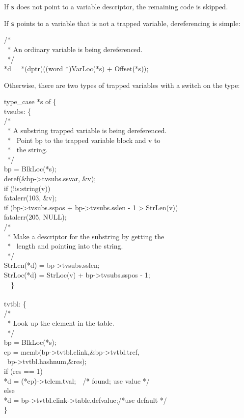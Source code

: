 \noindent
If \texttt{s} does not point to a variable descriptor, the remaining code is skipped.

If \texttt{s} points to a variable that is not a trapped variable,
dereferencing is simple:

\begin{iconcode}
\>\>\>/*\\
\>\>\>\ * An ordinary variable is being dereferenced.\\
\>\>\>\ */\\
\>\>\>*d = *(dptr)((word *)VarLoc(*s) + Offset(*s));
\end{iconcode}

Otherwise, there are two types of trapped variables with a switch on the type:

\begin{iconcode}
\>type\_case *s of \{\\
\>\>tvsubs: \{\\
\>\>\>/*\\
\>\>\>\ * A substring trapped variable is being dereferenced.\\
\>\>\>\ * \ Point bp to the trapped variable block and v to\\
\>\>\>\ * \ the string.\\
\>\>\>\ */\\
\>\>\>bp = BlkLoc(*s);\\
\>\>\>deref(\&bp->tvsubs.ssvar, \&v);\\
\>\>\>if (!is:string(v))\\
\>\>\>\>fatalerr(103, \&v);\\
\>\>\>if (bp->tvsubs.sspos + bp->tvsubs.sslen - 1 > StrLen(v))\\
\>\>\>\>fatalerr(205, NULL);\\
\>\>\>/*\\
\>\>\>\ * Make a descriptor for the substring by getting the\\
\>\>\>\ * \ length and pointing into the string.\\
\>\>\>\ */\\
\>\>\>StrLen(*d) = bp->tvsubs.sslen;\\
\>\>\>StrLoc(*d) = StrLoc(v) + bp->tvsubs.sspos - 1;\\
\>\>\ \ \}\\
\\
\>\>tvtbl: \{\\
\>\>\>/*\\
\>\>\>\ * Look up the element in the table.\\
\>\>\>\ */\\
\>\>\>bp = BlkLoc(*s);\\
\>\>\>ep = memb(bp->tvtbl.clink,\&bp->tvtbl.tref,\\
\>\>\>\>\>\>\ bp->tvtbl.hashnum,\&res);\\
\>\>\>if (res == 1)\\
\>\>\>\>*d = (*ep)->telem.tval;\ \ /* found; use value */\\
\>\>\>else\\
\>\>\>\>*d = bp->tvtbl.clink->table.defvalue;/*use default */\\
\>\>\>\}
\end{iconcode}

